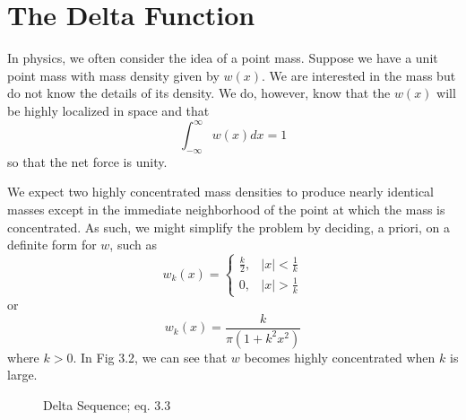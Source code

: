 \section{The Delta Function}
In physics, we often consider the idea of a point mass. Suppose we have a unit point mass with mass density given by \(w(x)\). We are interested in the mass but do not know the details of its density. We do, however, know that the \(w(x)\) will be highly localized in space and that 
\begin{equation}
    \int_{-\infty}^{\infty} w(x) dx = 1
\end{equation}
so that the net force is unity.

We expect two highly concentrated mass densities to produce nearly identical masses except in the immediate neighborhood of the point at which the mass is concentrated. As such, we might simplify the problem by deciding, a priori, on a definite form for \(w\), such as
\begin{equation}
    w_k(x) = \begin{cases}
        \frac{k}{2}, & |x|<\frac{1}{k}\\
        0, & |x|>\frac{1}{k}
    \end{cases}
\end{equation}
or
\begin{equation}
    w_k(x)=\frac{k}{\pi (1+k^2x^2)}
\end{equation}
where \(k>0\). In Fig 3.2, we can see that \(w\) becomes highly concentrated when \(k\) is large.

\begin{figure}[H]
    \centering
    \caption{Delta Sequence;  eq. 3.3}
\end{figure}

